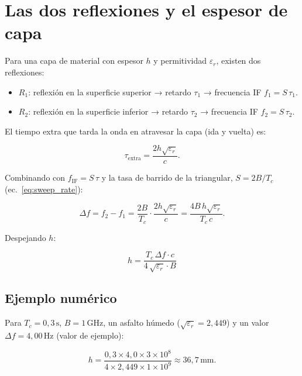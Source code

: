 \documentclass[12pt, a4paper, twoside]{report}
\begin{document}
\section{Las dos reflexiones y el espesor de capa}
\label{sec:dos_reflexiones}

Para una capa de material con espesor $h$ y permitividad $\varepsilon_r$,
existen dos reflexiones:

\begin{itemize}
  \item $R_1$: reflexión en la superficie superior → retardo $\tau_1$
    → frecuencia IF $f_1 = S\,\tau_1$.
  \item $R_2$: reflexión en la superficie inferior → retardo $\tau_2$
    → frecuencia IF $f_2 = S\,\tau_2$.
\end{itemize}

El tiempo extra que tarda la onda en atravesar la capa (ida y vuelta) es:

\begin{equation}
  \tau_\text{extra} = \frac{2h\sqrt{\varepsilon_r}}{c}.
\end{equation}

Combinando con $f_\text{IF} = S\,\tau$ y la tasa de barrido de la triangular,
$S = 2B/T_c$ (ec.~\eqref{eq:sweep_rate}):

\begin{equation}
  \Delta f = f_2 - f_1 = \frac{2B}{T_c}\cdot\frac{2h\sqrt{\varepsilon_r}}{c}
  = \frac{4B\,h\sqrt{\varepsilon_r}}{T_c\,c}.
\end{equation}

Despejando $h$:

\begin{equation}
  \boxed{
    h = \frac{T_c\,\Delta f\cdot c}{4\,\sqrt{\varepsilon_r}\cdot B}
  }
  \label{eq:espesor}
\end{equation}

\subsection{Ejemplo numérico}

Para $T_c = 0{,}3\,\text{s}$, $B = 1\,\text{GHz}$, un asfalto húmedo
($\sqrt{\varepsilon_r} = 2{,}449$) y un valor $\Delta f = 4{,}00\,\text{Hz}$
(valor de ejemplo):

\begin{equation*}
  h = \frac{0{,}3 \times 4{,}0 \times 3\times10^8}
  {4 \times 2{,}449 \times 1\times10^9}
  \approx 36{,}7\,\text{mm}.
\end{equation*}
\end{document}
